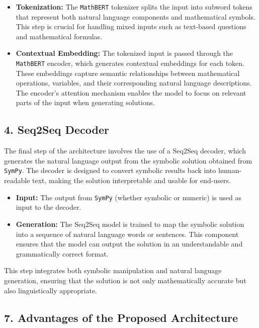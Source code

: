 \documentclass{article}
\begin{document}
\begin{itemize}
    \item \textbf{Tokenization:} The \texttt{MathBERT} tokenizer splits the input into subword tokens that represent both natural language components and mathematical symbols. This step is crucial for handling mixed inputs such as text-based questions and mathematical formulas.
    \item \textbf{Contextual Embedding:} The tokenized input is passed through the \texttt{MathBERT} encoder, which generates contextual embeddings for each token. These embeddings capture semantic relationships between mathematical operations, variables, and their corresponding natural language descriptions. The encoder's attention mechanism enables the model to focus on relevant parts of the input when generating solutions.
\end{itemize}

\subsection{4. Seq2Seq Decoder}

The final step of the architecture involves the use of a Seq2Seq decoder, which generates the natural language output from the symbolic solution obtained from \texttt{SymPy}. The decoder is designed to convert symbolic results back into human-readable text, making the solution interpretable and usable for end-users.

\begin{itemize}
    \item \textbf{Input:} The output from \texttt{SymPy} (whether symbolic or numeric) is used as input to the decoder.
    \item \textbf{Generation:} The Seq2Seq model is trained to map the symbolic solution into a sequence of natural language words or sentences. This component ensures that the model can output the solution in an understandable and grammatically correct format.
\end{itemize}

This step integrates both symbolic manipulation and natural language generation, ensuring that the solution is not only mathematically accurate but also linguistically appropriate.

\subsection{7. Advantages of the Proposed Architecture}
\end{document}
